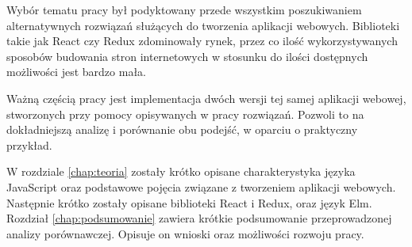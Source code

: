 Wybór tematu pracy był podyktowany przede wszystkim poszukiwaniem alternatywnych rozwiązań służących do tworzenia aplikacji webowych. Biblioteki takie jak React czy Redux zdominowały rynek, przez co ilość wykorzystywanych sposobów budowania stron internetowych w stosunku do ilości dostępnych możliwości jest bardzo mała.

Ważną częścią pracy jest implementacja dwóch wersji tej samej aplikacji webowej, stworzonych przy pomocy opisywanych w pracy rozwiązań. Pozwoli to na dokładniejszą analizę i porównanie obu podejść, w oparciu o praktyczny przykład.

W rozdziale \ref{chap:teoria} zostały krótko opisane charakterystyka języka JavaScript oraz podstawowe pojęcia związane z tworzeniem aplikacji webowych. Następnie krótko zostały opisane biblioteki React i Redux, oraz język Elm.
Rozdział \ref{chap:podsumowanie} zawiera krótkie podsumowanie przeprowadzonej analizy porównawczej. Opisuje on wnioski oraz możliwości rozwoju pracy.

